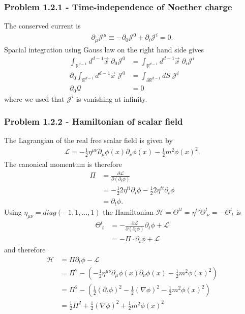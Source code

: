 \documentclass[10pt,a4paper]{book}
\theoremstyle{definition}
\begin{document}
\subsubsection{Problem 1.2.1 - Time-independence of Noether charge}
The conserved current is
\begin{align}
    \partial_\mu\mathcal{J}^\mu\equiv-\partial_0\mathcal{J}^0+\partial_i\mathcal{J}^i=0.
\end{align}
Spacial integration using Gauss law on the right hand side gives
\begin{align}
    \int_{\mathbb{R}^{d-1}} d^{d-1}\vec{x}\;\partial_0\mathcal{J}^0&=\int_{\mathbb{R}^{d-1}} d^{d-1}\vec{x}\;\partial_i\mathcal{J}^i\\
    \partial_0\int_{\mathbb{R}^{d-1}} d^{d-1}\vec{x}\;\mathcal{J}^0&=\int_{\partial\mathbb{R}^{d-1}} dS\;\mathcal{J}^i\\
    \partial_0\mathcal{Q}&=0
\end{align}
where we used that $\mathcal{J}^i$ is vanishing at infinity.

\subsubsection{Problem 1.2.2 - Hamiltonian of scalar field}
The Lagrangian of the real free scalar field is given by 
\begin{align}
    \mathcal{L}=-\frac{1}{2}\eta^{\mu\nu}\partial_\mu\phi(x)\partial_\nu\phi(x)-\frac{1}{2}m^2\phi(x)^2.
\end{align}
The canonical momentum is therefore
\begin{align}
    \Pi &= \frac{\partial\mathcal{L}}{\partial(\partial_t\phi)}\\
    &=-\frac{1}{2}2\eta^{ti}\partial_i\phi -\frac{1}{2}2\eta^{tt}\partial_t\phi\\
    &=\partial_t\phi.
\end{align}
Using $\eta_{\mu\nu}=diag(-1,1,...,1)$ the Hamiltonian $\mathcal{H}=\Theta^{tt}=\eta^{t\nu}\Theta^t_{\;\nu}=-\Theta^t_{\;t}$ is 
\begin{align}
    \Theta^t_{\;t}
    &=-\frac{\partial\mathcal{L}}{\partial(\partial_t\phi)}\partial_t\phi+\mathcal{L}\\
    &=-\Pi\cdot\partial_t\phi+\mathcal{L}
\end{align}
and therefore
\begin{align}
    \mathcal{H}&=\Pi\partial_t\phi-\mathcal{L}\\
    &=\Pi^2-\left(-\frac{1}{2}\eta^{\mu\nu}\partial_\mu\phi(x)\partial_\nu\phi(x)-\frac{1}{2}m^2\phi(x)^2\right)\\
    &=\Pi^2-\left(\frac{1}{2}(\partial_t\phi)^2-\frac{1}{2}(\nabla\phi)^2-\frac{1}{2}m^2\phi(x)^2\right)\\
    &=\frac{1}{2}\Pi^2+\frac{1}{2}(\nabla\phi)^2+\frac{1}{2}m^2\phi(x)^2
\end{align}
\end{document}
